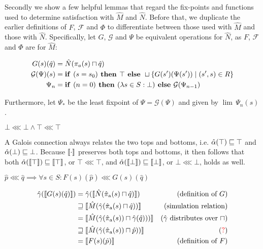 Secondly we show a few helpful lemmas that regard the fix-points and functions used to determine satisfaction with $\hat M$ and $\hat N$. Before that, we duplicate the earlier definitions of $F$, $\mathcal{F}$ and $\Phi$ to differentiate between those used with $\hat M$ and those with $\hat N$. Specifically, let $G$, $\mathcal{G}$ and $\Psi$ be equivalent operations for $\hat N$, as $F$, $\mathcal{F}$ and $\Phi$ are for $\hat M$:

\begin{align*}
G(s)(\hat q) &= \hat N(\pi_{a}(s) \sqcap \hat q) \\
\mathcal{G}(\Psi)(s) &= \textrm{\textbf{if }} (s = s_{0}) \textrm{\textbf{ then }} \top \textrm{\textbf{ else }} \sqcup \{ G(s')(\Psi(s')) \mid (s',s) \in R \} \\
\Psi_{n} &= \textrm{\textbf{if }} (n = 0) \textrm{\textbf{ then }} (\lambda s \in S : \bot) \textrm{\textbf{ else }} \mathcal{G}(\Psi_{n-1}) \\
\end{align*}

\noindent Furthermore, let $\Psi_{*}$ be the least fixpoint of $\Psi = \mathcal{G}(\Psi)$ and given by $\lim \, \Psi_{n}(s)$.

\begin{lemma} \label{lem:bot-refine-bot}
$\bot \lll \bot \wedge \top \lll \top$
\end{lemma}

A Galois connection always relates the two tops and bottoms, i.e. $\hat{\alpha}(\top) \sqsubseteq \top$ and $\hat{\alpha}(\bot) \sqsubseteq \bot$. Because $\llbracket \cdot \rrbracket$ preserves both tops and bottoms, it then follows that both $\hat{\alpha}(\llbracket \top \rrbracket) \sqsubseteq \llbracket \top \rrbracket$, or $\top \lll \top$, and $\hat{\alpha}(\llbracket \bot \rrbracket) \sqsubseteq \llbracket \bot \rrbracket$, or $\bot \lll \bot$, holds as well.

\begin{lemma} \label{lem:f-refine-g}
$\hat p \lll \hat q \implies \forall s \in S : F(s)(\hat p) \lll G(s)(\hat q)$
\end{lemma}
%
\begin{align*}
\hat{\gamma}(\llbracket G(s)(\hat q) \rrbracket)
  & =         \hat{\gamma}(\llbracket \hat N(\operatorname{\hat{\pi}_{\textrm{a}}}(s) \sqcap \hat q) \rrbracket)           & (\textrm{definition of } G) \\
  & \sqsupseteq \llbracket \hat M(\hat{\gamma}(\operatorname{\hat{\pi}_{\textrm{a}}}(s) \sqcap \hat q)) \rrbracket           & (\textrm{simulation relation}) \\
  & =         \llbracket \hat M(\hat{\gamma}(\operatorname{\hat{\pi}_{\textrm{a}}}(s)) \sqcap \hat{\gamma}(\hat q))) \rrbracket & (\hat{\gamma} \textrm{ distributes over } \sqcap) \\
  & \sqsupseteq \llbracket \hat M(\hat{\gamma}(\operatorname{\hat{\pi}_{\textrm{a}}}(s)) \sqcap \hat p)) \rrbracket          & (\textrm{\textcolor{red}{?}}) \\
  & =         \llbracket F(s)(\hat p) \rrbracket                                            & (\textrm{definition of } F)
\end{align*}

